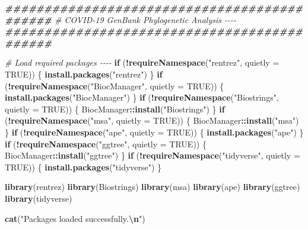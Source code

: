 \documentclass[
  11pt,
]{article}
\newenvironment{Shaded}{\begin{snugshade}}{\end{snugshade}}
\newcommand{\AttributeTok}[1]{\textcolor[rgb]{0.13,0.29,0.53}{#1}}
\newcommand{\CommentTok}[1]{\textcolor[rgb]{0.56,0.35,0.01}{\textit{#1}}}
\newcommand{\ConstantTok}[1]{\textcolor[rgb]{0.56,0.35,0.01}{#1}}
\newcommand{\ControlFlowTok}[1]{\textcolor[rgb]{0.13,0.29,0.53}{\textbf{#1}}}
\newcommand{\DocumentationTok}[1]{\textcolor[rgb]{0.56,0.35,0.01}{\textbf{\textit{#1}}}}
\newcommand{\FunctionTok}[1]{\textcolor[rgb]{0.13,0.29,0.53}{\textbf{#1}}}
\newcommand{\NormalTok}[1]{#1}
\newcommand{\SpecialCharTok}[1]{\textcolor[rgb]{0.81,0.36,0.00}{\textbf{#1}}}
\newcommand{\StringTok}[1]{\textcolor[rgb]{0.31,0.60,0.02}{#1}}
\begin{document}
\begin{Shaded}
\begin{Highlighting}[]
\DocumentationTok{\#\#\#\#\#\#\#\#\#\#\#\#\#\#\#\#\#\#\#\#\#\#\#\#\#\#\#\#\#\#\#\#\#\#\#\#\#\#\#\#\#\#\#\#}
\CommentTok{\# COVID{-}19 GenBank Phylogenetic Analysis {-}{-}{-}{-}}
\DocumentationTok{\#\#\#\#\#\#\#\#\#\#\#\#\#\#\#\#\#\#\#\#\#\#\#\#\#\#\#\#\#\#\#\#\#\#\#\#\#\#\#\#\#\#\#\#}

\CommentTok{\# Load required packages {-}{-}{-}{-}}
\ControlFlowTok{if}\NormalTok{ (}\SpecialCharTok{!}\FunctionTok{requireNamespace}\NormalTok{(}\StringTok{"rentrez"}\NormalTok{, }\AttributeTok{quietly =} \ConstantTok{TRUE}\NormalTok{)) \{}
  \FunctionTok{install.packages}\NormalTok{(}\StringTok{"rentrez"}\NormalTok{)}
\NormalTok{\}}
\ControlFlowTok{if}\NormalTok{ (}\SpecialCharTok{!}\FunctionTok{requireNamespace}\NormalTok{(}\StringTok{"BiocManager"}\NormalTok{, }\AttributeTok{quietly =} \ConstantTok{TRUE}\NormalTok{)) \{}
  \FunctionTok{install.packages}\NormalTok{(}\StringTok{"BiocManager"}\NormalTok{)}
\NormalTok{\}}
\ControlFlowTok{if}\NormalTok{ (}\SpecialCharTok{!}\FunctionTok{requireNamespace}\NormalTok{(}\StringTok{"Biostrings"}\NormalTok{, }\AttributeTok{quietly =} \ConstantTok{TRUE}\NormalTok{)) \{}
\NormalTok{  BiocManager}\SpecialCharTok{::}\FunctionTok{install}\NormalTok{(}\StringTok{"Biostrings"}\NormalTok{)}
\NormalTok{\}}
\ControlFlowTok{if}\NormalTok{ (}\SpecialCharTok{!}\FunctionTok{requireNamespace}\NormalTok{(}\StringTok{"msa"}\NormalTok{, }\AttributeTok{quietly =} \ConstantTok{TRUE}\NormalTok{)) \{}
\NormalTok{  BiocManager}\SpecialCharTok{::}\FunctionTok{install}\NormalTok{(}\StringTok{"msa"}\NormalTok{)}
\NormalTok{\}}
\ControlFlowTok{if}\NormalTok{ (}\SpecialCharTok{!}\FunctionTok{requireNamespace}\NormalTok{(}\StringTok{"ape"}\NormalTok{, }\AttributeTok{quietly =} \ConstantTok{TRUE}\NormalTok{)) \{}
  \FunctionTok{install.packages}\NormalTok{(}\StringTok{"ape"}\NormalTok{)}
\NormalTok{\}}
\ControlFlowTok{if}\NormalTok{ (}\SpecialCharTok{!}\FunctionTok{requireNamespace}\NormalTok{(}\StringTok{"ggtree"}\NormalTok{, }\AttributeTok{quietly =} \ConstantTok{TRUE}\NormalTok{)) \{}
\NormalTok{  BiocManager}\SpecialCharTok{::}\FunctionTok{install}\NormalTok{(}\StringTok{"ggtree"}\NormalTok{)}
\NormalTok{\}}
\ControlFlowTok{if}\NormalTok{ (}\SpecialCharTok{!}\FunctionTok{requireNamespace}\NormalTok{(}\StringTok{"tidyverse"}\NormalTok{, }\AttributeTok{quietly =} \ConstantTok{TRUE}\NormalTok{)) \{}
  \FunctionTok{install.packages}\NormalTok{(}\StringTok{"tidyverse"}\NormalTok{)}
\NormalTok{\}}

\FunctionTok{library}\NormalTok{(rentrez)}
\FunctionTok{library}\NormalTok{(Biostrings)}
\FunctionTok{library}\NormalTok{(msa)}
\FunctionTok{library}\NormalTok{(ape)}
\FunctionTok{library}\NormalTok{(ggtree)}
\FunctionTok{library}\NormalTok{(tidyverse)}

\FunctionTok{cat}\NormalTok{(}\StringTok{"Packages loaded successfully.}\SpecialCharTok{\textbackslash{}n}\StringTok{"}\NormalTok{)}
\end{Highlighting}
\end{Shaded}
\end{document}
